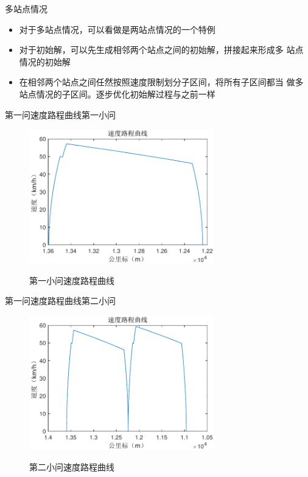 \documentclass{beamer}
\begin{document}
\begin{frame}{多站点情况}
\begin{itemize}
  \item<1-> 对于多站点情况，可以看做是两站点情况的一个特例
  \item<2-> 对于初始解，可以先生成相邻两个站点之间的初始解，拼接起来形成多
      站点情况的初始解
  \item<3-> 在相邻两个站点之间任然按照速度限制划分子区间，将所有子区间都当
      做多站点情况的子区间。逐步优化初始解过程与之前一样
\end{itemize}
\end{frame}

\begin{frame}{第一问速度路程曲线}{第一小问}
\begin{figure}
  \centering
  \includegraphics[width=8cm]{fig/fig9/fig9.pdf}\\
  \caption{第一小问速度路程曲线}
\end{figure}

\end{frame}

\begin{frame}{第一问速度路程曲线}{第二小问}
\begin{figure}
  \centering
  \includegraphics[width=8cm]{fig/fig10/fig10.pdf}\\
  \caption{第二小问速度路程曲线}
\end{figure}

\end{frame}
\end{document}
